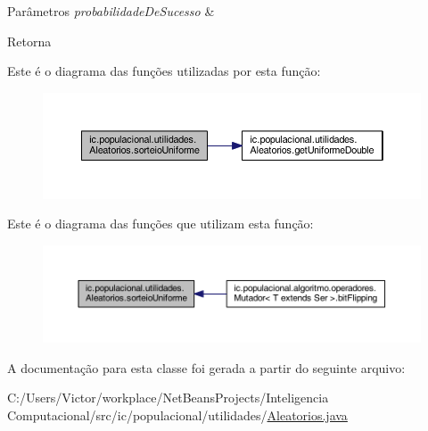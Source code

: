 \begin{DoxyParams}{Parâmetros}
{\em probabilidade\-De\-Sucesso} & \\
\hline
\end{DoxyParams}
\begin{DoxyReturn}{Retorna}

\end{DoxyReturn}


Este é o diagrama das funções utilizadas por esta função\-:\nopagebreak
\begin{figure}[H]
\begin{center}
\leavevmode
\includegraphics[width=350pt]{classic_1_1populacional_1_1utilidades_1_1_aleatorios_a92ad4ea348ed7dd0fd3e400f2389abe4_cgraph}
\end{center}
\end{figure}




Este é o diagrama das funções que utilizam esta função\-:
\nopagebreak
\begin{figure}[H]
\begin{center}
\leavevmode
\includegraphics[width=350pt]{classic_1_1populacional_1_1utilidades_1_1_aleatorios_a92ad4ea348ed7dd0fd3e400f2389abe4_icgraph}
\end{center}
\end{figure}




A documentação para esta classe foi gerada a partir do seguinte arquivo\-:\begin{DoxyCompactItemize}
\item 
C\-:/\-Users/\-Victor/workplace/\-Net\-Beans\-Projects/\-Inteligencia Computacional/src/ic/populacional/utilidades/\hyperlink{_aleatorios_8java}{Aleatorios.\-java}\end{DoxyCompactItemize}
